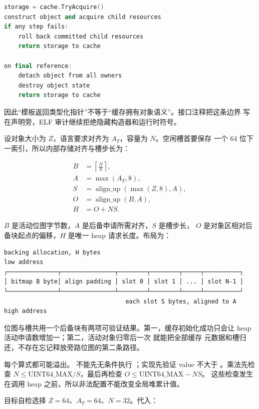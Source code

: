 \begin{lstlisting}[language=C++]
storage = cache.TryAcquire()
construct object and acquire child resources
if any step fails:
    roll back committed child resources
    return storage to cache

on final reference:
    detach object from all owners
    destroy object state
    return storage to cache
\end{lstlisting}

因此“模板返回类型化指针”不等于“缓存拥有对象语义”。接口注释把这条边界
写在声明旁，ELF 审计继续拒绝隐藏构造器和运行时符号。

设对象大小为 \(Z\)，语言要求对齐为 \(A_T\)，容量为 \(N\)。空闲槽首要保存
一个 64 位下一索引，所以内部存储对齐与槽步长为：

\[
\begin{aligned}
 B &= \left\lceil\frac{N}{8}\right\rceil,\\
 A &= \max(A_T,8),\\
 S &= \operatorname{align\_up}(\max(Z,8),A),\\
 O &= \operatorname{align\_up}(B,A),\\
 H &= O+N S.
\end{aligned}
\]

\(B\) 是活动位图字节数，\(A\) 是后备申请所需对齐，\(S\) 是槽步长，
\(O\) 是对象区相对后备块起点的偏移，\(H\) 是唯一 heap 请求长度。布局为：

\begin{verbatim}
backing allocation, H bytes
low address
┌──────────────┬───────────────┬────────┬────────┬─────┬──────────┐
│ bitmap B byte│ align padding │ slot 0 │ slot 1 │ ... │ slot N-1 │
└──────────────┴───────────────┴────────┴────────┴─────┴──────────┘
                                  each slot S bytes, aligned to A
high address
\end{verbatim}

位图与槽共用一个后备块有两项可验证结果。第一，缓存初始化成功只会让 heap
活动申请数增加一；第二，活动对象归零后一次  就能把全部缓存
元数据和槽归还，不存在忘记释放旁路位图的第二条路径。

每个算式都可能溢出。 不能先无条件执行
；实现先验证 value 不大于
。乘法先检查 \(N\le
\mathrm{UINT64\_MAX}/S\)，最后再检查 \(O\le\mathrm{UINT64\_MAX}-NS\)。
这些检查发生在调用 heap 之前，所以非法配置不能改变全局堆累计值。

目标自检选择 \(Z=64\)、\(A_T=64\)、\(N=32\)。代入：

